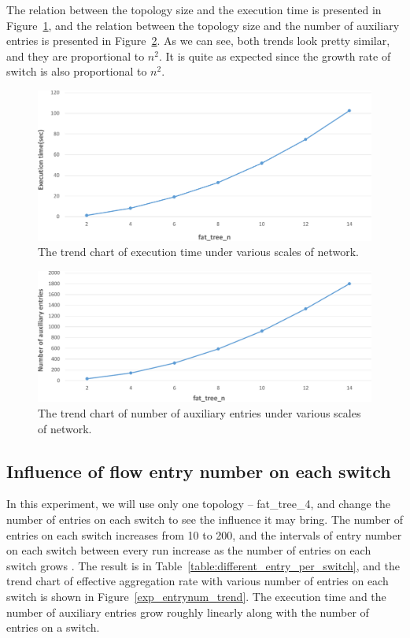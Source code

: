 The relation between the topology size and the execution time is presented in Figure~\ref{different_scale_time_trend}, and the relation between the topology size and the number of auxiliary entries is presented in Figure~\ref{different_scale_aux_trend}. As we can see, both trends look pretty similar, and they are proportional to $n^2$. It is quite as expected since the growth rate of switch is also proportional to $n^2$.

\begin{figure}[H]
\centering 
\includegraphics[width=1\textwidth]{figures/exp_scale_time_trend.pdf}
\caption{The trend chart of execution time under various scales of network.}
\label{different_scale_time_trend}
\end{figure}

\begin{figure}[H]
\centering 
\includegraphics[width=1\textwidth]{figures/exp_scale_aux_trend.pdf}
\caption{The trend chart of number of auxiliary entries under various scales of network.}
\label{different_scale_aux_trend}
\end{figure}

\subsection{Influence of flow entry number on each switch}
In this experiment, we will use only one topology -- fat\_tree\_4, and change the number of entries on each switch to see the influence it may bring. The number of entries on each switch increases from 10 to 200, and the intervals of entry number on each switch between every run increase as the number of entries on each switch grows \sout{}. The result is in Table~\ref{table:different_entry_per_switch}, and the trend chart of effective aggregation rate with various number of entries on each switch is shown in Figure~\ref{exp_entrynum_trend}. The execution time and the number of auxiliary entries grow roughly linearly along with the number of entries on a switch.

